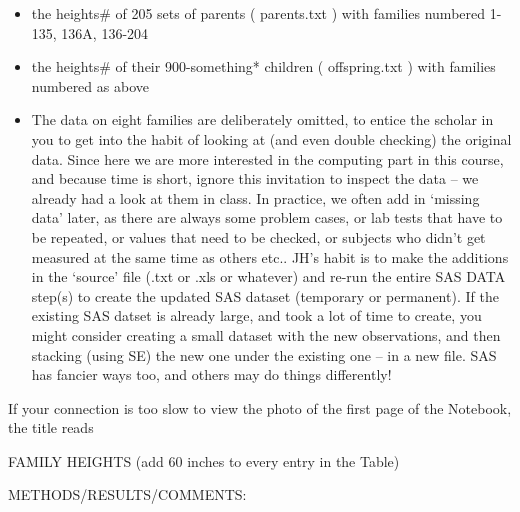 \documentclass[]{book}
\begin{document}
\begin{itemize}
\item
  the heights\# of 205 sets of parents ( parents.txt ) with families numbered 1-135, 136A, 136-204
\item
  the heights\# of their 900-something* children ( offspring.txt ) with families numbered as above
\item
  The data on eight families are deliberately omitted, to entice the scholar in you to get into the habit of looking at (and even double checking) the original data. Since here we are more interested in the computing part in this course, and because time is short, ignore this invitation to inspect the data -- we already had a look at them in class. In practice, we often add in `missing data' later, as there are always some problem cases, or lab tests that have to be repeated, or values that need to be checked, or subjects who didn't get measured at the same time as others etc.. JH's habit is to make the additions in the `source' file (.txt or .xls or whatever) and re-run the entire SAS DATA step(s) to create the updated SAS dataset (temporary or permanent). If the existing SAS datset is already large, and took a lot of time to create, you might consider creating a small dataset with the new observations, and then stacking (using SE) the new one under the existing one -- in a new file. SAS has fancier ways too, and others may do things differently!
\end{itemize}

If your connection is too slow to view the photo of the first page of the Notebook, the title reads

FAMILY HEIGHTS
(add 60 inches to every entry in the Table)

METHODS/RESULTS/COMMENTS:
\end{document}
